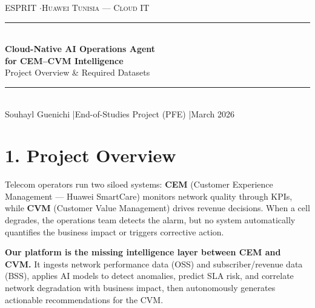 \documentclass[12pt,a4paper]{article}
\begin{document}
\begin{center}
{\large\textsc{ESPRIT} \quad$\cdot$\quad \textsc{Huawei Tunisia — Cloud IT}}\\[6pt]
\rule{0.8\linewidth}{0.6pt}\\[8pt]
{\LARGE\bfseries Cloud-Native AI Operations Agent\\[4pt]for CEM--CVM Intelligence}\\[6pt]
{\large Project Overview \& Required Datasets}\\[4pt]
\rule{0.8\linewidth}{0.6pt}\\[6pt]
{\small Souhayl Guenichi \quad|\quad End-of-Studies Project (PFE) \quad|\quad March 2026}
\end{center}

\vspace{0.4cm}

\section*{1. Project Overview}

Telecom operators run two siloed systems: \textbf{CEM} (Customer Experience Management — Huawei SmartCare) monitors network quality through KPIs, while \textbf{CVM} (Customer Value Management) drives revenue decisions. When a cell degrades, the operations team detects the alarm, but no system automatically quantifies the business impact or triggers corrective action.

\textbf{Our platform is the missing intelligence layer between CEM and CVM.} It ingests network performance data (OSS) and subscriber/revenue data (BSS), applies AI models to detect anomalies, predict SLA risk, and correlate network degradation with business impact, then autonomously generates actionable recommendations for the CVM.
\end{document}
